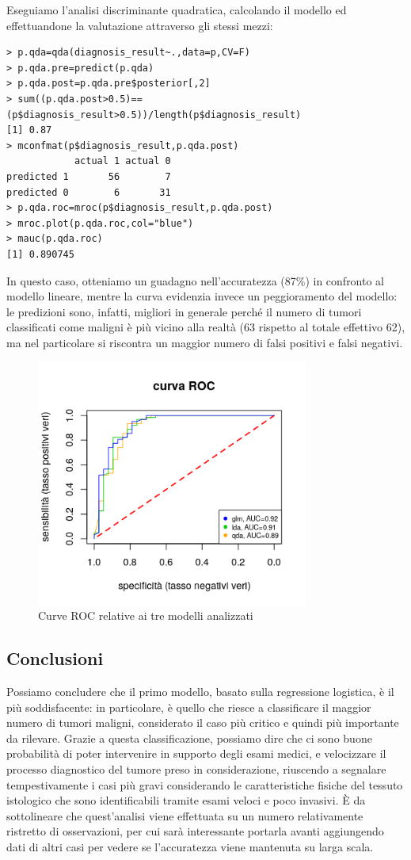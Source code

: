 \documentclass[11pt,a4paper,oneside]{article}
\begin{document}
Eseguiamo l'analisi discriminante quadratica, calcolando il modello ed effettuandone la valutazione attraverso gli stessi mezzi:
\begin{verbatim}
> p.qda=qda(diagnosis_result~.,data=p,CV=F)
> p.qda.pre=predict(p.qda)
> p.qda.post=p.qda.pre$posterior[,2]
> sum((p.qda.post>0.5)==(p$diagnosis_result>0.5))/length(p$diagnosis_result)
[1] 0.87
> mconfmat(p$diagnosis_result,p.qda.post)
            actual 1 actual 0
predicted 1       56        7
predicted 0        6       31
> p.qda.roc=mroc(p$diagnosis_result,p.qda.post)
> mroc.plot(p.qda.roc,col="blue")
> mauc(p.qda.roc)
[1] 0.890745
\end{verbatim}
In questo caso, otteniamo un guadagno nell'accuratezza (87\%) in confronto al modello lineare, mentre la curva evidenzia invece un peggioramento del modello: le predizioni sono, infatti, migliori in generale perché il numero di tumori classificati come maligni è più vicino alla realtà (63 rispetto al totale effettivo 62), ma nel particolare si riscontra un maggior numero di falsi positivi e falsi negativi.
\begin{figure}[h]
\centering
\includegraphics[width=0.8\textwidth]{images/curveROC}
\caption{Curve ROC relative ai tre modelli analizzati}
\label{fig:curveROC}
\end{figure}

\subsection{Conclusioni}
Possiamo concludere che il primo modello, basato sulla regressione logistica, è il più soddisfacente: in particolare, è quello che riesce a classificare il maggior numero di tumori maligni, considerato il caso più critico e quindi più importante da rilevare. Grazie a questa classificazione, possiamo dire che ci sono buone probabilità di poter intervenire in supporto degli esami medici, e velocizzare il processo diagnostico del tumore preso in considerazione, riuscendo a segnalare tempestivamente i casi più gravi considerando le caratteristiche fisiche del tessuto istologico che sono identificabili tramite esami veloci e poco invasivi. È da sottolineare che quest'analisi viene effettuata su un numero relativamente ristretto di osservazioni, per cui sarà interessante portarla avanti aggiungendo dati di altri casi per vedere se l'accuratezza viene mantenuta su larga scala.
\end{document}
